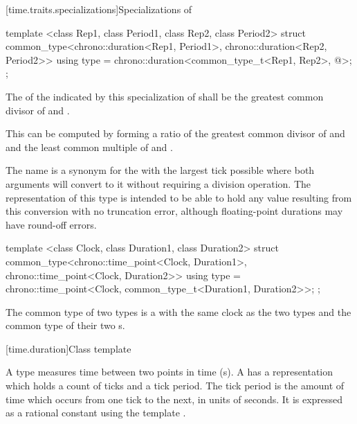 [time.traits.specializations]{Specializations of }

%
\begin{itemdecl}
template <class Rep1, class Period1, class Rep2, class Period2>
struct common_type<chrono::duration<Rep1, Period1>, chrono::duration<Rep2, Period2>> {
  using type = chrono::duration<common_type_t<Rep1, Rep2>, @\seebelow@>;
};
\end{itemdecl}

\pnum
The  of the  indicated by this specialization of
 shall be the greatest common divisor of  and
. \begin{note} This can be computed by forming a ratio of the
greatest common divisor of  and  and the
least common multiple of  and .
\end{note}

\pnum
\begin{note} The  name  is a synonym for the
 with the largest tick  possible where both
 arguments will convert to it without requiring a division
operation. The representation of this type is intended to be able to hold any
value resulting from this conversion with no truncation error, although
floating-point durations may have round-off errors. \end{note}

%
\begin{itemdecl}
template <class Clock, class Duration1, class Duration2>
struct common_type<chrono::time_point<Clock, Duration1>, chrono::time_point<Clock, Duration2>> {
  using type = chrono::time_point<Clock, common_type_t<Duration1, Duration2>>;
};
\end{itemdecl}

\pnum
The common type of two  types is a  with the same
clock as the two types and the common type of their two s.

[time.duration]{Class template }

\pnum
A  type measures time between two points in time (s).
A  has a representation which holds a count of ticks and a tick period.
The tick period is the amount of time which occurs from one tick to the next, in units
of seconds. It is expressed as a rational constant using the template .

